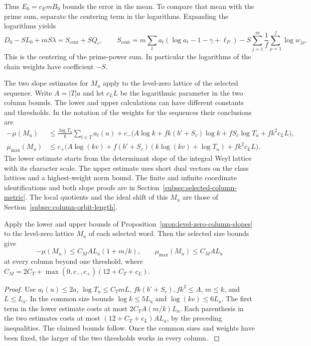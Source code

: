 Thus \(E_0=c_E mB_0\) bounds the error in the mean. To compare that mean with the prime sum, separate the centering term in the logarithms.
Expanding the logarithms yields
\[
 D_0-SL_0+mS\lambda=S_{\mathrm{cent}}+SQ_c,\qquad
 S_{\mathrm{cent}}=m\sum_t a_t(\log a_t-1-\gamma+\ell_P)
                 -S\sum_{j=1}^m\frac1f\sum_{\rho=1}^f\log w_{j\rho}.
\]
This is the centering of the prime-power sum. In particular the
logarithms of the chain weights have coefficient \(-S\).

The two slope estimates for \(M_u\) apply to the level-zero
lattice of the selected sequence. Write \(A=|T|a\)
and let \(c_L L\) be the logarithmic parameter in the two
column bounds. The lower and upper calculations can have
different constants and thresholds. In the notation of the
weights for the sequences their conclusions are
\begin{align*}
 -\mu(M_u) &\le
  \frac{\log T_u}{k}\sum_{t\in T}a_t(u)
  +c_-\bigl(A\log k+fk(b'+S_c)\log k+
        fS_c\log T_u+fk^2 c_L L\bigr),\\
 \mu_{\max}(M_u)&\le
  c_+\bigl(A\log(kv)+f(b'+S_c)(k\log(kv)+\log T_u)
          +fk^2 c_L L\bigr).
\end{align*}
The lower estimate starts from the determinant slope of
the integral Weyl lattice with its character scale. The
upper estimate uses short dual vectors on the class lattices
and a highest-weight norm bound. The finite and infinite
coordinate identifications and both slope proofs are in
Section~\ref{subsec:selected-column-metric}. The local quotients and the ideal
shift of this \(M_u\) are those of
Section~\ref{subsec:column-orbit-length}.
\label{cor:frames-4}

\begin{lemma}\label{lem:reference-column-slopes}
Apply the lower and upper bounds of
Proposition~\ref{prop:level-zero-column-slopes} to the level-zero
lattice \(M_u\) of each selected word. Then the selected size bounds give
\[
 -\mu(M_u)\le C_M A L_a(1+m/k),\qquad
 \mu_{\max}(M_u)\le C_M A L_a
\]
at every column beyond one threshold, where
\(C_M=2C_T+\max(0,c_-,c_+)(12+C_T+c_L)\).
\end{lemma}
\begin{proof}
Use \(a_t(u)\le2a\), \(\log T_u\le C_TmL\),
\(fk(b'+S_c),fk^2\le A\), \(m\le k\), and \(L\le L_a\).
In the common size bounds \(\log k\le5L_a\) and
\(\log(kv)\le6L_a\). The first term in the lower estimate costs at
most \(2C_T A(m/k)L_a\). Each parenthesis in the two estimates costs
at most \((12+C_T+c_L)A L_a\), by the preceding inequalities.
The claimed bounds follow. Once the common sizes and weights have
been fixed, the larger of the two thresholds works in every column.
\label{cor:frames-5}
\end{proof}

